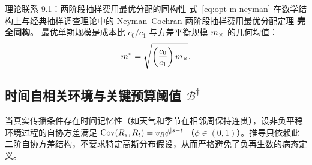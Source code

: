 \begin{insightbox}{理论联系 9.1：两阶段抽样费用最优分配的同构性}
式~\eqref{eq:opt-m-neyman} 在数学结构上与经典抽样调查理论中的 Neyman--Cochran 两阶段抽样费用最优分配定理 \citep{cochran1977sampling} \textbf{完全同构}。
最优单期规模是成本比 $c_0/c_1$ 与方差平衡规模 $m_\times$ 的几何均值：
\begin{equation}
  m^* = \sqrt{\left(\frac{c_0}{c_1}\right) m_\times}.
\end{equation}
\end{insightbox}

\subsection{时间自相关环境与关键预算阈值 $\mathcal{B}^\dagger$}

当真实传播条件存在时间记忆性（如天气和季节在相邻周保持连贯），设非负平稳环境过程的自协方差满足 $\mathrm{Cov}(R_s, R_t) = v_R \phi^{|s-t|}$（$\phi \in (0, 1)$）。推导只依赖此二阶自协方差结构，不要求特定高斯分布假设，从而严格避免了负再生数的病态定义。

